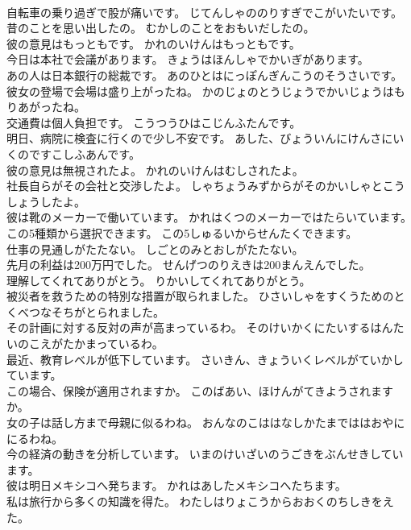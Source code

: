 \documentclass[8pt]{extreport}
\begin{document}
\begin{CJK}{UTF8}{min}
\\	自転車の乗り過ぎで股が痛いです。	じてんしゃののりすぎでこがいたいです。 
\\	昔のことを思い出したの。	むかしのことをおもいだしたの。 
\\	彼の意見はもっともです。	かれのいけんはもっともです。 
\\	今日は本社で会議があります。	きょうはほんしゃでかいぎがあります。 
\\	あの人は日本銀行の総裁です。	あのひとはにっぽんぎんこうのそうさいです。 
\\	彼女の登場で会場は盛り上がったね。	かのじょのとうじょうでかいじょうはもりあがったね。 
\\	交通費は個人負担です。	こうつうひはこじんふたんです。 
\\	明日、病院に検査に行くので少し不安です。	あした、びょういんにけんさにいくのですこしふあんです。 
\\	彼の意見は無視されたよ。	かれのいけんはむしされたよ。 
\\	社長自らがその会社と交渉したよ。	しゃちょうみずからがそのかいしゃとこうしょうしたよ。 
\\	彼は靴のメーカーで働いています。	かれはくつのメーカーではたらいています。 
\\	この5種類から選択できます。	この5しゅるいからせんたくできます。 
\\	仕事の見通しがたたない。	しごとのみとおしがたたない。 
\\	先月の利益は200万円でした。	せんげつのりえきは200まんえんでした。 
\\	理解してくれてありがとう。	りかいしてくれてありがとう。 
\\	被災者を救うための特別な措置が取られました。	ひさいしゃをすくうためのとくべつなそちがとられました。 
\\	その計画に対する反対の声が高まっているわ。	そのけいかくにたいするはんたいのこえがたかまっているわ。 
\\	最近、教育レベルが低下しています。	さいきん、きょういくレベルがていかしています。 
\\	この場合、保険が適用されますか。	このばあい、ほけんがてきようされますか。 
\\	女の子は話し方まで母親に似るわね。	おんなのこははなしかたまでははおやににるわね。 
\\	今の経済の動きを分析しています。	いまのけいざいのうごきをぶんせきしています。 
\\	彼は明日メキシコへ発ちます。	かれはあしたメキシコへたちます。 
\\	私は旅行から多くの知識を得た。	わたしはりょこうからおおくのちしきをえた。 

\end{CJK}
\end{document}
